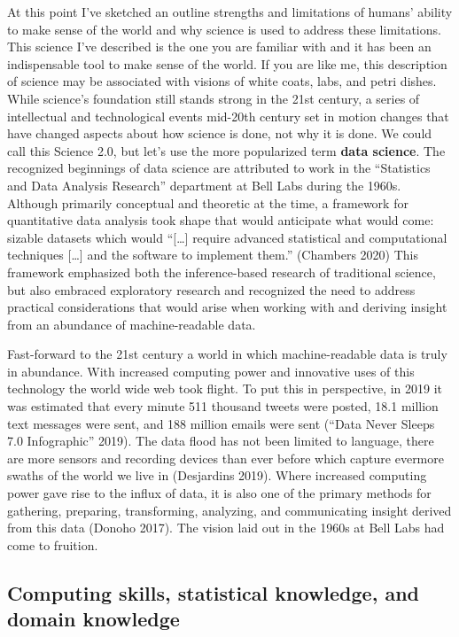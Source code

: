 \documentclass[
  letterpaper,
]{latex/krantz}
\begin{document}
At this point I've sketched an outline strengths and limitations of
humans' ability to make sense of the world and why science is used to
address these limitations. This science I've described is the one you
are familiar with and it has been an indispensable tool to make sense of
the world. If you are like me, this description of science may be
associated with visions of white coats, labs, and petri dishes. While
science's foundation still stands strong in the 21st century, a series
of intellectual and technological events mid-20th century set in motion
changes that have changed aspects about how science is done, not why it
is done. We could call this Science 2.0, but let's use the more
popularized term \textbf{data science}. The
recognized beginnings of data science are attributed to work in the
``Statistics and Data Analysis Research'' department at Bell Labs during
the 1960s. Although primarily conceptual and theoretic at the time, a
framework for quantitative data analysis took shape that would
anticipate what would come: sizable datasets which would ``{[}\ldots{]}
require advanced statistical and computational techniques {[}\ldots{]}
and the software to implement them.'' (Chambers 2020) This framework
emphasized both the inference-based research of traditional science, but
also embraced exploratory research and recognized the need to address
practical considerations that would arise when working with and deriving
insight from an abundance of machine-readable data.

Fast-forward to the 21st century a world in which machine-readable data
is truly in abundance. With increased computing power and innovative
uses of this technology the world wide web took flight. To put this in
perspective, in 2019 it was estimated that every minute 511 thousand
tweets were posted, 18.1 million text messages were sent, and 188
million emails were sent ({``Data Never Sleeps 7.0 Infographic''} 2019).
The data flood has not been limited to language, there are more sensors
and recording devices than ever before which capture evermore swaths of
the world we live in (Desjardins 2019). Where increased computing power
gave rise to the influx of data, it is also one of the primary methods
for gathering, preparing, transforming, analyzing, and communicating
insight derived from this data (Donoho 2017). The vision laid out in the
1960s at Bell Labs had come to fruition.

\hypertarget{computing-skills-statistical-knowledge-and-domain-knowledge}{%
\subsection{Computing skills, statistical knowledge, and domain
knowledge}\label{computing-skills-statistical-knowledge-and-domain-knowledge}}
\end{document}
